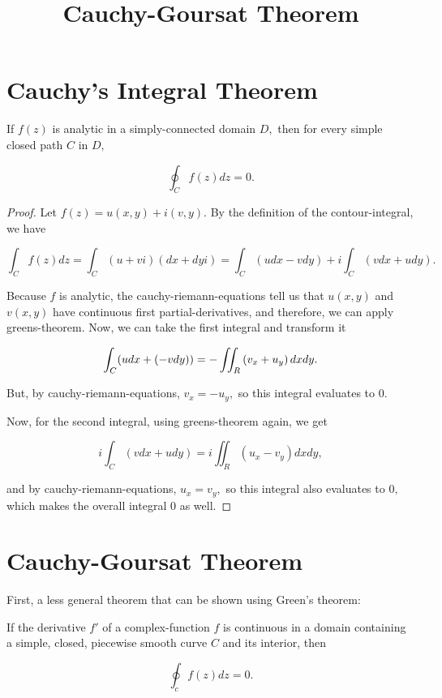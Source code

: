 \documentclass{article}
\title{Cauchy-Goursat Theorem}
\begin{document}
\section{Cauchy's Integral Theorem}
\begin{theorem}\label{cauchys-integral-theorem}
If $f(z)$ is \@{analytic} in a \@{simply-connected} \@{domain} $D,$ then for every \@{simple} \@{closed} \@{path} $C$ in $D,$

\[ \oint_C f(z) dz = 0. \]
\end{theorem}

\begin{proof}
Let $f(z) = u(x,y) + i(v,y).$ By the definition of the \@{contour-integral}, we have

\[ \int_{C} f(z) dz = \int_C (u+vi)(dx + dyi) = \int_C ( u dx - vdy ) + i \int_C (vdx + udy). \]

Because $f$ is \@{analytic}, the \@{cauchy-riemann-equations} tell us that $u(x,y)$ and $v(x,y)$ have \@{continuous} first \@{partial-derivatives}, and therefore, we can apply \@{greens-theorem}. Now, we can take the first integral and transform it

\[ \int_C ( u dx + (-vdy) ) = -\iint_R \left(v_x + u_y\right) dxdy. \]

But, by \@{cauchy-riemann-equations}, $v_x = -u_y,$ so this integral evaluates to $0.$

Now, for the second integral, using \@{greens-theorem} again, we get

\[ i \int_C (vdx + udy) = i\iint_R (u_x - v_y) dxdy, \]

and by \@{cauchy-riemann-equations}, $u_x = v_y,$ so this integral also evaluates to $0,$ which makes the overall integral $0$ as well.
\end{proof}

\section{Cauchy-Goursat Theorem}

First, a less general theorem that can be shown using Green's theorem:

\begin{theorem}\label{cauchy-integral-theorem}
If the derivative $f'$ of a \@{complex-function} $f$ is \@{continuous} in a \@{domain} containing a simple, closed, piecewise \@{smooth} curve $C$ and its interior, then

\[ \oint_c f(z) dz = 0. \]
\end{theorem}
\end{document}
